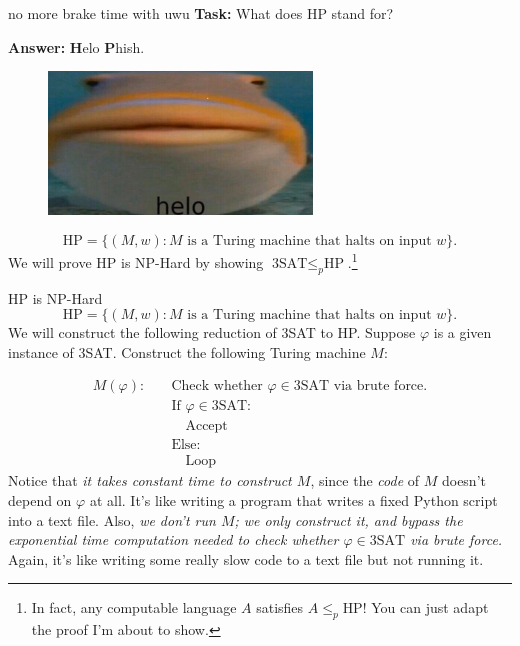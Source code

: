 \documentclass{beamer}
\begin{document}
\begin{frame}{no more brake time with uwu}
\textbf{Task:} What does HP stand for?

\textbf{Answer:} \textbf{H}elo \textbf{P}hish.
\begin{figure}[h]
\centering
\includegraphics[width=7cm]{img/helo_fish.jpg}
\end{figure}
$$\text{HP} = \{(M, w): \text{$M$ is a Turing machine that halts on input $w$}\}.$$
We will prove HP is NP-Hard by showing $\text{3SAT} \leq_p \text{HP}$.\footnote{In fact, any computable language $A$ satisfies $A \leq_p \text{HP}$! You can just adapt the proof I'm about to show.}
\end{frame}

\begin{frame}{HP is NP-Hard}
$$\text{HP} = \{(M, w): \text{$M$ is a Turing machine that halts on input $w$}\}.$$
We will construct the following reduction of 3SAT to HP. Suppose $\varphi$ is a given instance of 3SAT. Construct the following Turing machine $M$:

\begin{align*}
M(\varphi): \quad &\text{Check whether $\varphi \in \text{3SAT}$ via brute force.}\\
&\text{If $\varphi \in \text{3SAT}$:}\\
&\quad \text{Accept}\\
&\text{Else:}\\
&\quad \text{Loop}
\end{align*}
Notice that \textit{it takes constant time to construct $M$}, since the \textit{code} of $M$ doesn't depend on $\varphi$ at all. It's like writing a program that writes a fixed Python script into a text file. Also, \textit{we don't run $M$; we only construct it, and bypass the exponential time computation needed to check whether $\varphi \in \text{3SAT}$ via brute force.} Again, it's like writing some really slow code to a text file but not running it.

\end{frame}
\end{document}
